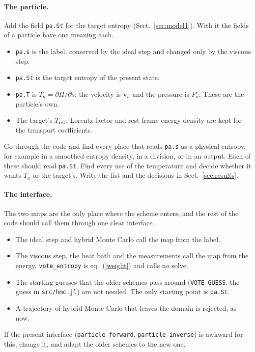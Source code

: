 \documentclass[11pt,aps,preprint,nofootinbib,superscriptaddress,tightenlines]{revtex4-2}
\def\Eq#1{eq.~(\ref{#1})}
\def\Sect#1{Sect.~\ref{#1}}
\let\oldparagraph\paragraph
\renewcommand{\paragraph}{\par\bigskip\oldparagraph}
\begin{document}
\paragraph{The particle.}  Add the field \texttt{pa.St} for the target entropy (\Sect{sec:model1}).  With it the fields of a particle have one meaning
each.
\begin{itemize}
\item \texttt{pa.s} is the label, conserved by the ideal step and changed only by the viscous step.
\item \texttt{pa.St} is the target entropy of the present state.
\item \texttt{pa.T} is $T_a=\partial H/\partial s$, the velocity is $\bm v_a$ and the pressure is $P_a$.  These are the particle's own.
\item The target's $T_{\rm rel}$, Lorentz factor and rest-frame energy density are kept for the transport coefficients.
\end{itemize}
Go through the code and find every place that reads \texttt{pa.s} as a physical entropy, for example in a smoothed entropy density, in a division, or
in an output.  Each of these should read \texttt{pa.St}.  Find every use of the temperature and decide whether it wants $T_a$ or the target's.  Write the
list and the decisions in \Sect{sec:results}.

\paragraph{The interface.}  The two maps are the only place where the scheme enters, and the rest of the code should call them through one clear
interface.
\begin{itemize}
\item The ideal step and hybrid Monte Carlo call the map from the label.
\item The viscous step, the heat bath and the measurements call the map from the energy.  \texttt{vote\_entropy} is \Eq{weight} and calls no solve.
\item The starting guesses that the older schemes pass around (\texttt{VOTE\_GUESS}, the guess in \nolinkurl{src/hmc.jl}) are not needed.  The only
  starting point is \texttt{pa.St}.
\item A trajectory of hybrid Monte Carlo that leaves the domain is rejected, as now.
\end{itemize}
If the present interface (\texttt{particle\_forward}, \texttt{particle\_inverse}) is awkward for this, change it, and adapt the older schemes to the
new one.
\end{document}
